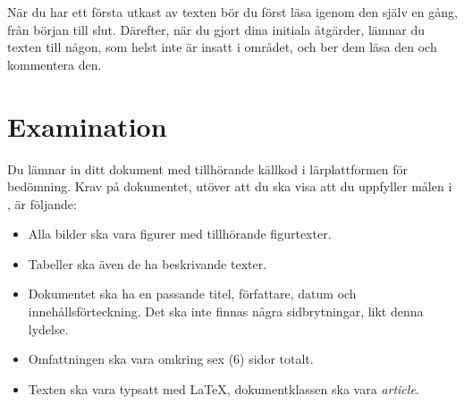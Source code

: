 \documentclass[a4paper]{miunasgn}
\begin{document}
När du har ett första utkast av texten bör du först läsa igenom den själv en 
gång, från början till slut.
Därefter, när du gjort dina initiala åtgärder, lämnar du texten till någon, som 
helst inte är insatt i området, och ber dem läsa den och kommentera den.


\section{Examination}
\label{sec:Examination}
Du lämnar in ditt dokument med tillhörande källkod i lärplattformen för 
bedömning.
Krav på dokumentet, utöver att du ska visa att du uppfyller målen 
i , är följande:
\begin{itemize}
  \item Alla bilder ska vara figurer med tillhörande figurtexter.
  \item Tabeller ska även de ha beskrivande texter.
  \item Dokumentet ska ha en passande titel, författare, datum och 
    innehållsförteckning.
    Det ska inte finnas några sidbrytningar, likt denna lydelse.
  \item Omfattningen ska vara omkring sex (6) sidor totalt.
  \item Texten ska vara typsatt med LaTeX, dokumentklassen ska vara 
    \emph{article}.
\end{itemize}


\printbibliography
\end{document}
